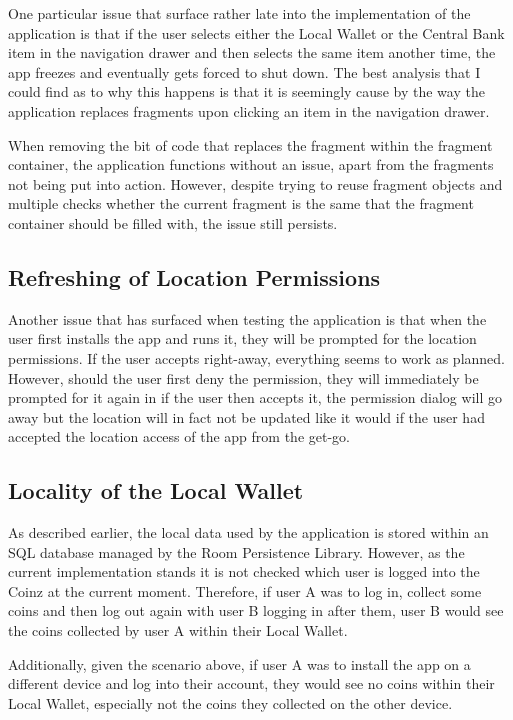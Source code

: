 \documentclass[11pt,a4paper,notitlepage]{article}
\begin{document}
    One particular issue that surface rather late into the implementation of the application is that if the user selects either the Local Wallet or the Central Bank item in the navigation drawer and then selects the same item another time, the app freezes and eventually gets forced to shut down. The best analysis that I could find as to why this happens is that it is seemingly cause by the way the application replaces fragments upon clicking an item in the navigation drawer.

    When removing the bit of code that replaces the fragment within the fragment container, the application functions without an issue, apart from the fragments not being put into action. However, despite trying to reuse fragment objects and multiple checks whether the current fragment is the same that the fragment container should be filled with, the issue still persists.

\subsection{Refreshing of Location Permissions}

    Another issue that has surfaced when testing the application is that when the user first installs the app and runs it, they will be prompted for the location permissions. If the user accepts right-away, everything seems to work as planned. However, should the user first deny the permission, they will immediately be prompted for it again in if the user then accepts it, the permission dialog will go away but the location will in fact not be updated like it would if the user had accepted the location access of the app from the get-go.

\subsection{Locality of the Local Wallet}

    As described earlier, the local data used by the application is stored within an SQL database managed by the Room Persistence Library. However, as the current implementation stands it is not checked which user is logged into the Coinz at the current moment. Therefore, if user A was to log in, collect some coins and then log out again with user B logging in after them, user B would see the coins collected by user A within their Local Wallet.

    Additionally, given the scenario above, if user A was to install the app on a different device and log into their account, they would see no coins within their Local Wallet, especially not the coins they collected on the other device.
\end{document}
